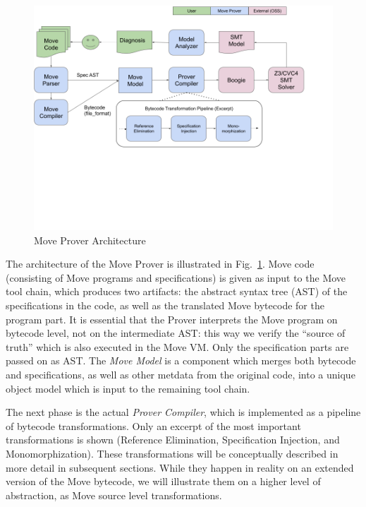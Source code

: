 
\begin{figure}[t!]
  \centering
  \includegraphics[trim=0 250 0 0, width=\textwidth]{arch.png}
  \caption{Move Prover Architecture}
  \label{fig:Arch}
\end{figure}

The architecture of the Move Prover is illustrated in Fig.~\ref{fig:Arch}. Move
code (consisting of Move programs and specifications) is given as input to the
Move tool chain, which produces two artifacts: the abstract syntax tree (AST) of
the specifications in the code, as well as the translated Move bytecode for the
program part. It is essential that the Prover interprets the Move program on
bytecode level, not on the intermediate AST: this way we verify the ``source of
truth'' which is also executed in the Move VM. Only the specification parts are
passed on as AST. The \emph{Move Model} is a component which merges both
bytecode and specifications, as well as other metdata from the original code,
into a unique object model which is input to the remaining tool chain.

The next phase is the actual \emph{Prover Compiler}, which is implemented as a
pipeline of bytecode transformations. Only an excerpt of the most important
transformations is shown (Reference Elimination, Specification Injection, and
Monomorphization). These transformations will be conceptually described in more
detail in subsequent sections. While they happen in reality on an extended
version of the Move bytecode, we will illustrate them on a higher level of
abstraction, as Move source level transformations.

